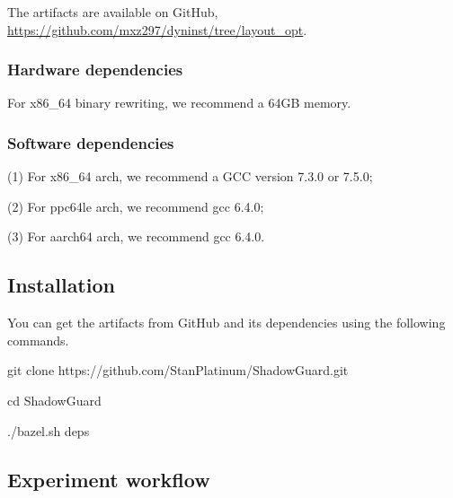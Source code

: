 \documentclass{sigplanconf}
\begin{document}
{The artifacts are available on GitHub, \url{https://github.com/mxz297/dyninst/tree/layout_opt}.


\subsubsection{Hardware dependencies}

For x86\_64 binary rewriting, we recommend a 64GB memory.

\subsubsection{Software dependencies}

(1) For x86\_64 arch, we recommend a GCC version 7.3.0 or 7.5.0;

(2) For ppc64le arch, we recommend gcc 6.4.0; 

(3) For aarch64 arch, we recommend gcc 6.4.0.




\subsection{Installation}


You can get the artifacts from GitHub and its dependencies using the following
commands.



git clone https://github.com/StanPlatinum/ShadowGuard.git

cd ShadowGuard

./bazel.sh deps


\subsection{Experiment workflow}

}
\end{document}
